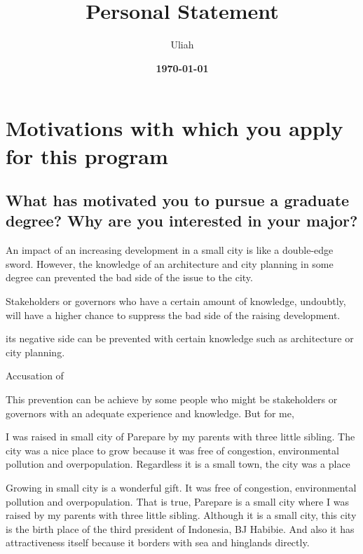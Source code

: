 \documentclass[11pt]{simart} %
\title{
\textbf{Personal Statement} \\
} %
\date{\textbf{\today}}
\author{Uliah}
\begin{document}
\maketitle %

\section{Motivations with which you apply for this program}
\subsection{What has motivated you to pursue a graduate degree? Why are you interested in your major?}

An impact of an increasing development in a small city is like a double-edge sword.
However, the knowledge of an architecture and city planning in some degree can prevented the bad side of the issue to the city.

Stakeholders or governors who have a certain amount of knowledge, undoubtly, will have a higher chance to suppress the bad side of the raising development.

its negative side can be prevented with certain knowledge such as architecture or city planning.

Accusation of

This prevention can be achieve by some people who might be stakeholders or governors with an adequate experience and knowledge. But for me,

I was raised in small city of Parepare by my parents with three little sibling. The city was a nice place to grow because it was free of congestion, environmental pollution and overpopulation. Regardless it is a small town, the city was a place

Growing in small city is a wonderful gift. It was free of congestion, environmental pollution and overpopulation. That is true, Parepare is a small city where I was raised by my parents with three little sibling. Although it is a small city, this city is the birth place of the third president of Indonesia, BJ Habibie. And also it has attractiveness itself because it borders with sea and hinglands directly.
\end{document}
